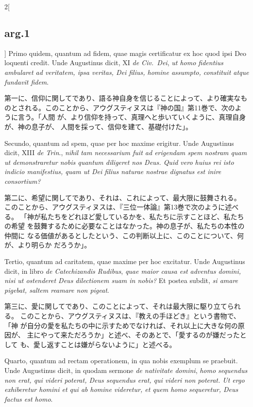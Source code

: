 \documentclass[paper=a4paper,fontsize=10pt,jafontsize=9pt,titlepage]{jlreq}
\begin{document}
\begin{paracol}{2}[\subsection{arg.1}]
Primo quidem, quantum ad fidem, quae magis
 certificatur ex hoc quod ipsi Deo loquenti credit. Unde Augustinus
 dicit, XI {\itshape de Civ.~Dei}, {\itshape ut homo fidentius ambularet ad veritatem, ipsa
 veritas, Dei filius, homine assumpto, constituit atque fundavit
 fidem}.

\switchcolumn

第一に、信仰に関してであり、語る神自身を信じることによって、より確実なも
 のとされる。このことから、アウグスティヌスは『神の国』第11巻で、次のよ
 うに言う。「人間
 が、より信仰を持って、真理へと歩いていくように、真理自身が、神の息子が、
 人間を採って、信仰を建て、基礎付けた」。

\switchcolumn*

Secundo, quantum ad spem, quae per hoc maxime erigitur. 
Unde
 Augustinus dicit, XIII {\itshape de Trin}., {\itshape nihil tam necessarium fuit ad
 erigendam spem nostram quam ut demonstraretur nobis quantum diligeret
 nos Deus. Quid vero huius rei isto indicio manifestius, quam ut Dei
 filius naturae nostrae dignatus est inire consortium? }

\switchcolumn

第二に、希望に関してであり、それは、これによって、最大限に鼓舞される。
このことから、アウグスティヌスは、『三位一体論』第13巻で次のように述べる。
「神が私たちをどれほど愛しているかを、私たちに示すことほど、私たちの希望
 を鼓舞するために必要なことはなかった。神の息子が、私たちの本性の仲間に
 なる価値があるとしたという、この判断以上に、このことについて、何が、より明らか
 だろうか」。

\switchcolumn*

Tertio, quantum
 ad caritatem, quae maxime per hoc excitatur. Unde Augustinus dicit, in
 libro {\itshape de Catechizandis Rudibus}, {\itshape quae maior causa est adventus domini,
 nisi ut ostenderet Deus dilectionem suam in nobis?} Et postea subdit, {\itshape si
 amare pigebat, saltem reamare non pigeat}.

\switchcolumn

第三に、愛に関してであり、このことによって、それは最大限に駆り立てられる。
 このことから、アウグスティヌスは、『教えの手ほどき』という書物で、「神
 が自分の愛を私たちの中に示すためでなければ、それ以上に大きな何の原因が、
 主にやって来ただろうか」と述べ、そのあとで、「愛するのが嫌だったとして
 も、愛し返すことは嫌がらないように」と述べる。

\switchcolumn*

Quarto, quantum ad rectam
 operationem, in qua nobis exemplum se praebuit. Unde Augustinus dicit,
 in quodam sermone {\itshape de nativitate domini}, {\itshape homo sequendus non erat, qui
 videri poterat, Deus sequendus erat, qui videri non poterat. Ut ergo
 exhiberetur homini et qui ab homine videretur, et quem homo sequeretur,
 Deus factus est homo}.


\end{paracol}
\end{document}
